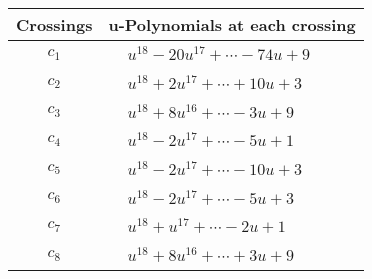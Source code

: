 \documentclass[1p]{elsarticle_modified}
\theoremstyle{definition}
\begin{document}
\begin{tabular}{m{50pt}|m{274pt}}
Crossings & \hspace{64pt}u-Polynomials at each crossing \\
\hline $$\begin{aligned}c_{1}\end{aligned}$$&$\begin{aligned}
&u^{18}-20 u^{17}+\cdots-74 u+9
\end{aligned}$\\
\hline $$\begin{aligned}c_{2}\end{aligned}$$&$\begin{aligned}
&u^{18}+2 u^{17}+\cdots+10 u+3
\end{aligned}$\\
\hline $$\begin{aligned}c_{3}\end{aligned}$$&$\begin{aligned}
&u^{18}+8 u^{16}+\cdots-3 u+9
\end{aligned}$\\
\hline $$\begin{aligned}c_{4}\end{aligned}$$&$\begin{aligned}
&u^{18}-2 u^{17}+\cdots-5 u+1
\end{aligned}$\\
\hline $$\begin{aligned}c_{5}\end{aligned}$$&$\begin{aligned}
&u^{18}-2 u^{17}+\cdots-10 u+3
\end{aligned}$\\
\hline $$\begin{aligned}c_{6}\end{aligned}$$&$\begin{aligned}
&u^{18}-2 u^{17}+\cdots-5 u+3
\end{aligned}$\\
\hline $$\begin{aligned}c_{7}\end{aligned}$$&$\begin{aligned}
&u^{18}+u^{17}+\cdots-2 u+1
\end{aligned}$\\
\hline $$\begin{aligned}c_{8}\end{aligned}$$&$\begin{aligned}
&u^{18}+8 u^{16}+\cdots+3 u+9
\end{aligned}$\\

\end{tabular}
\end{document}
